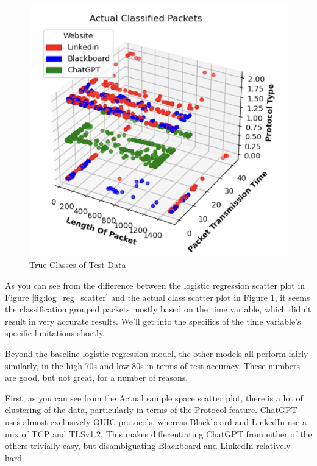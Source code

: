 \documentclass[10pt,sigconf,letterpaper,nonacm]{acmart}
\begin{document}
\begin{figure}
    \centering
    \includegraphics[width=1\linewidth]{Figures_and_Graphs/ActualClassifiedPacketsScatterpng.png}
    \caption{True Classes of Test Data}
    \label{fig:actual_scatter}
\end{figure}

As you can see from the difference between the logistic regression scatter plot in Figure \ref{fig:log_reg_scatter} and the actual class scatter plot in Figure \ref{fig:actual_scatter}, it seems the classification grouped packets mostly based on the time variable, which didn't result in very accurate results. We'll get into the specifics of the time variable's specific limitations shortly.

Beyond the baseline logistic regression model, the other models all perform fairly similarly, in the high 70s and low 80s in terms of test accuracy.
These numbers are good, but not great, for a number of reasons.

First, as you can see from the Actual sample space scatter plot, there is a lot of clustering of the data, particularly in terms of the Protocol feature. ChatGPT uses almost exclusively QUIC protocols, whereas Blackboard and LinkedIn use a mix of TCP and TLSv1.2. This makes differentiating ChatGPT from either of the others trivially easy, but disambiguating Blackboard and LinkedIn relatively hard.
\end{document}
